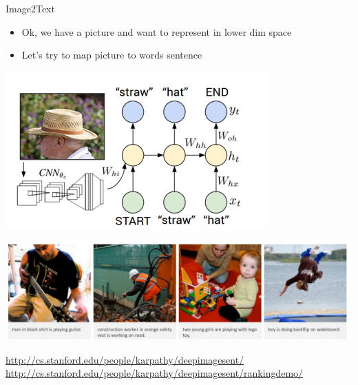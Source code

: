 \documentclass{beamer}
\begin{document}
\begin{frame}{Image2Text}
	\begin{itemize}
		\pause\item Ok, we have a picture and want to represent in lower dim space
		\pause\item Let's try to map picture to words sentence
	\end{itemize}
	\begin{center}
	\pause	\includegraphics[scale=0.3]{img/nt}
		
	\pause	\includegraphics[scale=0.3]{img/ntw}
	\end{center}

	\pause\href{http://cs.stanford.edu/people/karpathy/deepimagesent/}{http://cs.stanford.edu/people/karpathy/deepimagesent/}
	\pause\href{http://cs.stanford.edu/people/karpathy/deepimagesent/rankingdemo/}{http://cs.stanford.edu/people/karpathy/deepimagesent/rankingdemo/}
\end{frame}
\end{document}
